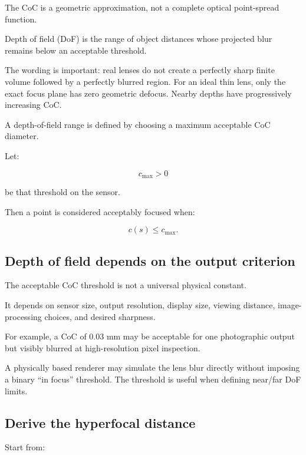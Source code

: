The CoC is a geometric approximation, not a complete optical point-spread function.

Depth of field (DoF) is the range of object distances whose projected blur remains below an acceptable threshold.

The wording is important: real lenses do not create a perfectly sharp finite volume followed by a perfectly blurred region. For an ideal thin lens, only the exact focus plane has zero geometric defocus. Nearby depths have progressively increasing CoC.

A depth-of-field range is defined by choosing a maximum acceptable CoC diameter.

Let:

\[ c_{\max}>0 \]

be that threshold on the sensor.

Then a point is considered acceptably focused when:

\[ \boxed{ c(s)\le c_{\max}. } \]

\subsection{Depth of field depends on the output criterion}\label{02-foundations-ii-ch036-depth-of-field-depends-on-the-output-criterion}

\hypertarget{02-foundations-ii-ch036-depth-of-field-depends-on-the-output-criterion}{}

The acceptable CoC threshold is not a universal physical constant.

It depends on sensor size, output resolution, display size, viewing distance, image-processing choices, and desired sharpness.

For example, a CoC of 0.03 mm may be acceptable for one photographic output but visibly blurred at high-resolution pixel inspection.

A physically based renderer may simulate the lens blur directly without imposing a binary ``in focus'' threshold. The threshold is useful when defining near/far DoF limits.

\subsection{Derive the hyperfocal distance}\label{02-foundations-ii-ch036-derive-the-hyperfocal-distance}

\hypertarget{02-foundations-ii-ch036-derive-the-hyperfocal-distance}{}

Start from:


